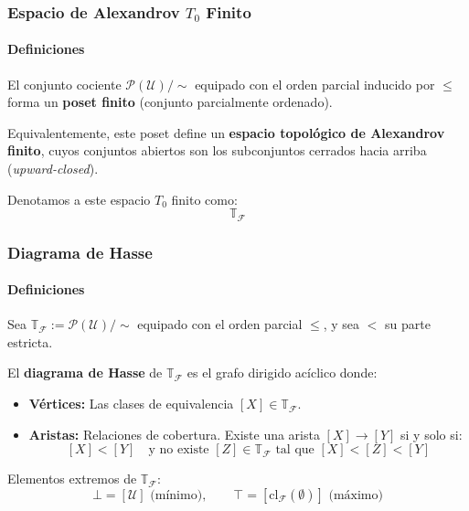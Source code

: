 \documentclass[aspectratio=169,12pt]{beamer}
\begin{document}
\begin{frame}
    \frametitle{Espacio de Alexandrov $T_0$ Finito}
    \framesubtitle{Definiciones}

    El conjunto cociente $\mathcal{P}(\mathcal{U})/\sim$ equipado con el orden parcial inducido por $\leq$ forma un \textbf{poset finito} (conjunto parcialmente ordenado). 
    
    \vspace{0.4cm}
    
    Equivalentemente, este poset define un \textbf{espacio topológico de Alexandrov finito}, cuyos conjuntos abiertos son los subconjuntos cerrados hacia arriba (\textit{upward-closed}). 
    
    \vspace{0.4cm}
    
    Denotamos a este espacio $T_0$ finito como:
    \[ \mathbb{T}_{\mathcal{F}} \]
\end{frame}

\begin{frame}
    \frametitle{Diagrama de Hasse}
    \framesubtitle{Definiciones}

    Sea $\mathbb{T}_{\mathcal{F}} := \mathcal{P}(\mathcal{U})/\sim$ equipado con el orden parcial $\leq$, y sea $<$ su parte estricta. 
    
    El \textbf{diagrama de Hasse} de $\mathbb{T}_{\mathcal{F}}$ es el grafo dirigido acíclico donde:
    \begin{itemize}
        \item \textbf{Vértices:} Las clases de equivalencia $[X] \in \mathbb{T}_{\mathcal{F}}$.
        \item \textbf{Aristas:} Relaciones de cobertura. Existe una arista $[X] \rightarrow [Y]$ si y solo si:
        \[ [X] < [Y] \quad \text{y no existe } [Z] \in \mathbb{T}_{\mathcal{F}} \text{ tal que } [X] < [Z] < [Y] \]
    \end{itemize}

    \vspace{0.3cm}
    
    Elementos extremos de $\mathbb{T}_{\mathcal{F}}$:
    \[ \bot = [\mathcal{U}] \text{ (mínimo)}, \qquad \top = [\mathrm{cl}_{\mathcal{F}}(\emptyset)] \text{ (máximo)} \]
\end{frame}
\end{document}
